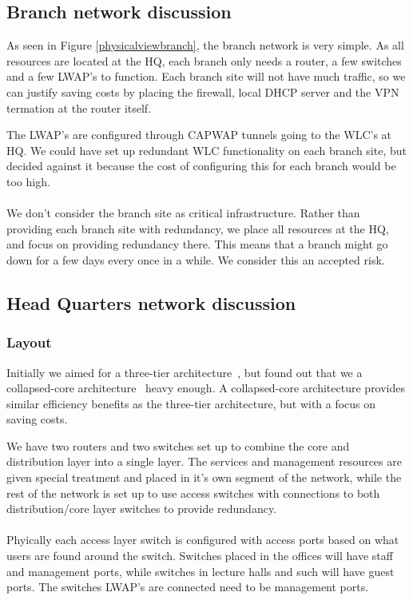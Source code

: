 \subsection{Branch network discussion}


As seen in Figure \ref{physicalviewbranch}, the branch network is very simple. As all resources are located at the HQ, each branch only needs a router, a few switches and a few LWAP's to function. Each branch site will not have much traffic, so we can justify saving costs by placing the firewall, local DHCP server and the VPN termation at the router itself.

The LWAP's are configured through CAPWAP tunnels going to the WLC's at HQ. We could have set up redundant WLC functionality on each branch site, but decided against it because the cost of configuring this for each branch would be too high.
\\
\\
We don't consider the branch site as critical infrastructure. Rather than providing each branch site with redundancy, we place all resources at the HQ, and focus on providing redundancy there. This means that a branch might go down for a few days every once in a while. We consider this an accepted risk.

\subsection{Head Quarters network discussion}

\subsubsection{Layout}

Initially we aimed for a three-tier architecture~\cite{todo}, but found out that we a collapsed-core architecture~\cite{todo} heavy enough. A collapsed-core architecture provides similar efficiency benefits as the three-tier architecture, but with a focus on saving costs.

We have two routers and two switches set up to combine the core and distribution layer into a single layer. The services and management resources are given special treatment and placed in it's own segment of the network, while the rest of the network is set up to use access switches with connections to both distribution/core layer switches to provide redundancy.
\\
\\
Phyically each access layer switch is configured with access ports based on what users are found around the switch. Switches placed in the offices will have staff and management ports, while switches in lecture halls and such will have guest ports. The switches LWAP's are connected need to be management ports. 


